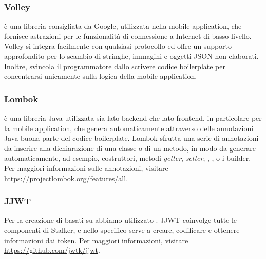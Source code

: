 \documentclass[../../manuale-manutentore.tex]{subfiles}
\begin{document}
\subsubsection{Volley}%
\label{subs:volley}

 è una libreria consigliata da Google, utilizzata nella mobile application, che fornisce astrazioni per le funzionalità di connessione a Internet di basso livello.
Volley si integra facilmente con qualsiasi protocollo ed offre un supporto approfondito per lo scambio di stringhe, immagini e oggetti JSON non elaborati.
Inoltre, svincola il programmatore dallo scrivere codice boilerplate per concentrarsi unicamente sulla logica della mobile application.

\subsubsection{Lombok}%
\label{subs:lombok}

 è una libreria Java utilizzata sia lato backend che lato frontend, in particolare per la mobile application, che genera automaticamente attraverso delle annotazioni Java buona parte del codice boilerplate.
Lombok sfrutta una serie di annotazioni da inserire alla dichiarazione di una classe o di un metodo, in modo da generare automaticamente, ad esempio, costruttori, metodi \textit{getter}, \textit{setter}, , , o i builder.
Per maggiori informazioni sulle annotazioni, visitare \href{https://projectlombok.org/features/all}{https://projectlombok.org/features/all}.

\subsubsection{JJWT}%
\label{subs:jjwt}

Per la creazione di  basati su  abbiamo utilizzato .
JJWT coinvolge tutte le componenti di Stalker, e nello specifico serve a creare, codificare e ottenere informazioni dai token.
Per maggiori informazioni, visitare \href{https://github.com/jwtk/jjwt}{https://github.com/jwtk/jjwt}.
\end{document}
